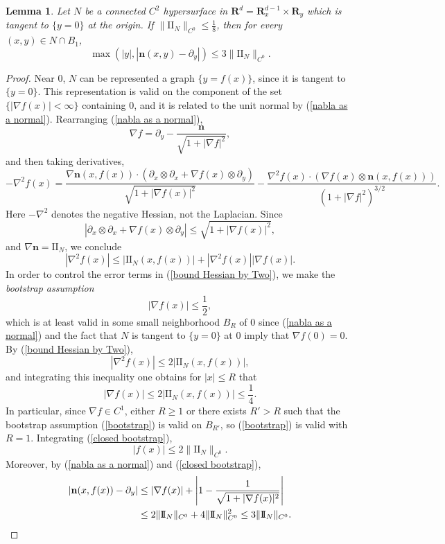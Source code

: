 \documentclass[reqno,11pt]{amsart}
\newcommand{\RR}{\mathbf{R}}
\newcommand{\Two}{\mathrm{I\!I}}
\newcommand{\normal}{\mathbf n}
\newcommand{\dfn}[1]{\emph{#1}\index{#1}}
\newtheorem{lemma}[theorem]{Lemma}
\theoremstyle{definition}
\numberwithin{equation}{section}
\begin{document}
\begin{lemma}\label{existence of tubes}
	Let $N$ be a connected $C^2$ hypersurface in $\RR^d = \RR^{d - 1}_x \times \RR_y$ which is tangent to $\{y = 0\}$ at the origin.
	If $\|\Two_N\|_{C^0} \leq \frac{1}{8}$, then for every $(x, y) \in N \cap B_1$,
	$$\max(|y|, |\normal(x, y) - \partial_y|) \leq 3\|\Two_N\|_{C^0}.$$
\end{lemma}
\begin{proof}
	Near $0$, $N$ can be represented a graph $\{y = f(x)\}$, since it is tangent to $\{y = 0\}$.
	This representation is valid on the component of the set $\{|\nabla f(x)| < \infty\}$ containing $0$, and it is related to the unit normal by (\ref{nabla as a normal}).
	Rearranging (\ref{nabla as a normal}),
	$$\nabla f = \partial_y - \frac{\normal}{\sqrt{1 + |\nabla f|^2}},$$
	and then taking derivatives,
	$$-\nabla^2 f(x) = \frac{\nabla \normal(x, f(x)) \cdot (\partial_x \otimes \partial_x + \nabla f(x) \otimes \partial_y)}{\sqrt{1 + |\nabla f(x)|^2}} - \frac{\nabla^2 f(x) \cdot (\nabla f(x) \otimes \normal(x, f(x)))}{(1 + |\nabla f|^2)^{3/2}}.$$
	Here $-\nabla^2$ denotes the negative Hessian, not the Laplacian.
	Since
	$$|\partial_x \otimes \partial_x + \nabla f(x) \otimes \partial_y| \leq \sqrt{1 + |\nabla f(x)|^2},$$
	and $\nabla \normal = \Two_N$, we conclude
\begin{equation}\label{bound Hessian by Two}
	|\nabla^2 f(x)| \leq |\Two_N(x, f(x))| + |\nabla^2 f(x)| |\nabla f(x)|.
\end{equation}
	In order to control the error terms in (\ref{bound Hessian by Two}), we make the \dfn{bootstrap assumption}
\begin{equation}\label{bootstrap}
	|\nabla f(x)| \leq \frac{1}{2},
\end{equation}
	which is at least valid in some small neighborhood $B_R$ of $0$ since (\ref{nabla as a normal}) and the fact that $N$ is tangent to $\{y = 0\}$ at $0$ imply that $\nabla f(0) = 0$.
	By (\ref{bound Hessian by Two}),
$$|\nabla^2 f(x)| \leq 2|\Two_N(x, f(x))|,$$
	and integrating this inequality one obtains for $|x| \leq R$ that
\begin{equation}\label{closed bootstrap}
	|\nabla f(x)| \leq 2|\Two_N(x, f(x))| \leq \frac{1}{4}.
\end{equation}
	In particular, since $\nabla f \in C^1$, either $R \geq 1$ or there exists $R' > R$ such that the bootstrap assumption (\ref{bootstrap}) is valid on $B_{R'}$, so (\ref{bootstrap}) is valid with $R = 1$.
	Integrating (\ref{closed bootstrap}),
$$|f(x)| \leq 2\|\Two_N\|_{C^0}.$$
	Moreover, by (\ref{nabla as a normal}) and (\ref{closed bootstrap}),
\begin{align*}
	|\normal(x, f(x)) - \partial_y| &\leq |\nabla f(x)| + \left|1 - \frac{1}{\sqrt{1 + |\nabla f(x)|^2}}\right| \\
	&\leq 2\|\Two_N\|_{C^0} + 4\|\Two_N\|_{C^0}^2 \leq 3\|\Two_N\|_{C^0}. \qedhere
\end{align*}
\end{proof}
\end{document}
